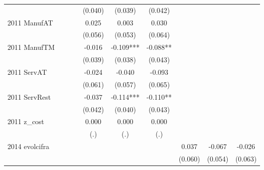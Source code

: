 \begin{table}[htbp]
\begin{tabular}{l*{9}{c}}
                    &               &               &               &     (0.040)   &     (0.039)   &     (0.042)   &               &               &               \\
2011 ManufAT        &               &               &               &       0.025   &       0.003   &       0.030   &               &               &               \\
                    &               &               &               &     (0.056)   &     (0.053)   &     (0.064)   &               &               &               \\
2011 ManufTM        &               &               &               &      -0.016   &      -0.109***&      -0.088** &               &               &               \\
                    &               &               &               &     (0.039)   &     (0.038)   &     (0.043)   &               &               &               \\
2011 ServAT         &               &               &               &      -0.024   &      -0.040   &      -0.093   &               &               &               \\
                    &               &               &               &     (0.061)   &     (0.057)   &     (0.065)   &               &               &               \\
2011 ServRest       &               &               &               &      -0.037   &      -0.114***&      -0.110** &               &               &               \\
                    &               &               &               &     (0.042)   &     (0.040)   &     (0.043)   &               &               &               \\
2011 z\_cost         &               &               &               &       0.000   &       0.000   &       0.000   &               &               &               \\
                    &               &               &               &         (.)   &         (.)   &         (.)   &               &               &               \\
2014 evolcifra      &               &               &               &               &               &               &       0.037   &      -0.067   &      -0.026   \\
                    &               &               &               &               &               &               &     (0.060)   &     (0.054)   &     (0.063)   \\

\end{tabular}
\end{table}
